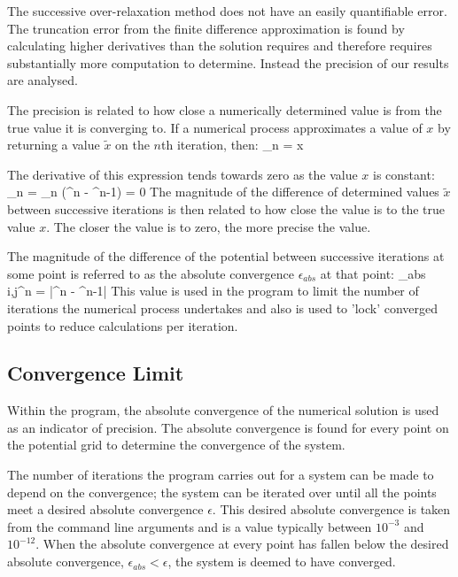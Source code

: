 The successive over-relaxation method does not have an easily quantifiable error. The truncation error from the finite difference approximation is found by calculating higher derivatives than the solution requires and therefore requires substantially more computation to determine. Instead the precision of our results are analysed.

The precision is related to how close a numerically determined value is from the true value it is converging to. If a numerical process approximates a value of $x$ by returning a value $\tilde{x}$ on the $n$th iteration, then:
\be
\lim_{n \rightarrow \infty} = x                     
\ee

The derivative of this expression tends towards zero as the value $x$ is constant:
\be
\lim_{n \rightarrow \infty} = \lim_{n \rightarrow \infty} (^{n} - ^{n-1}) = 0                     
\ee
The magnitude of the difference of determined values $\tilde{x}$ between successive iterations is then related to how close the value is to the true value $x$. The closer the value is to zero, the more precise the value.

The magnitude of the difference of the potential between successive iterations at some point is referred to as the absolute convergence $\epsilon_{abs}$ at that point:
\be
\epsilon_{abs \; i,j}^{n} = |\tilde{\phi}^{n} - \tilde{\phi}^{n-1}|
\ee
This value is used in the program to limit the number of iterations the numerical process undertakes and also is used to 'lock' converged points to reduce calculations per iteration.
\subsection{Convergence Limit}
Within the program, the absolute convergence of the numerical solution is used as an indicator of precision. The absolute convergence is found for every point on the potential grid to determine the convergence of the system.

The number of iterations the program carries out for a system can be made to depend on the convergence; the system can be iterated over until all the points meet a desired absolute convergence $\epsilon$. This desired absolute convergence is taken from the command line arguments and is a value typically between $10^{-3}$ and $10^{-12}$. When the absolute convergence at every point has fallen below the desired absolute convergence, $\epsilon_{abs} < \epsilon$, the system is deemed to have converged. 

